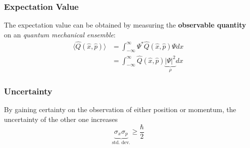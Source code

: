\subsubsection{Expectation Value}
The expectation value can be obtained by measuring the \textbf{observable quantity} on an \textit{quantum mechanical ensemble}:
\begin{align*}
    \langle \hat{Q}(\hat{x},\hat{p})\rangle & = \int_{-\infty}^{\infty}\Psi^*\hat{Q}(\hat{x},\hat{p})\Psi dx                    \\
                                            & = \int_{-\infty}^{\infty}\hat{Q}(\hat{x},\hat{p}) \underbrace{|\Psi|^2}_{\rho} dx
\end{align*}

\subsubsection{Uncertainty}
By gaining certainty on the observation of either position or momentum, the uncertainty of the other one increases
\begin{equation*}
    \underbrace{\sigma_x\sigma_p}_{\text{std. dev.}} \geq \frac{\hbar}{2}
\end{equation*}
